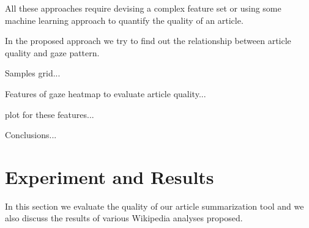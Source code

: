 \documentclass[12pt]{article}
\begin{document}
%
%
%
%
%


All these approaches require devising a complex feature set or using some machine learning approach to quantify the quality of an article. 

In the proposed approach we try to find out the relationship between article quality and gaze pattern.

Samples grid...

Features of gaze heatmap to evaluate article quality...

plot for these features...

Conclusions...

\section{Experiment and Results}
In this section we evaluate the quality of our article summarization tool and we also discuss the results of various Wikipedia analyses proposed. 
\end{document}
